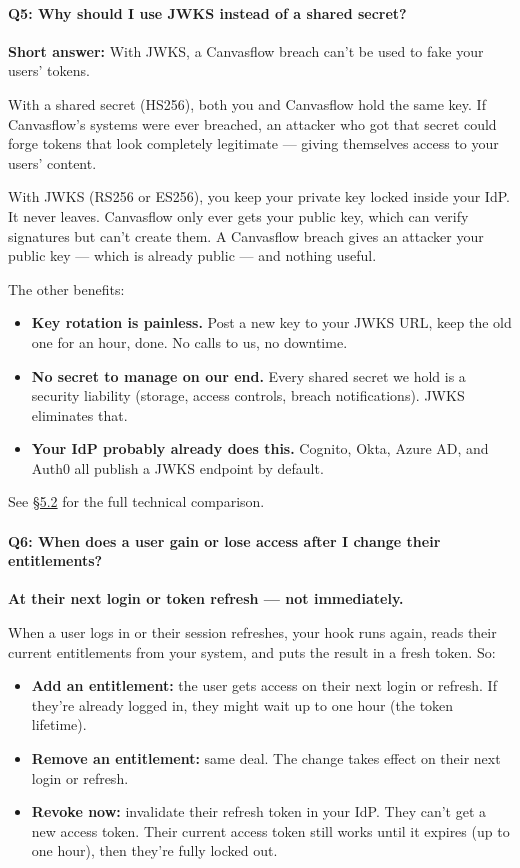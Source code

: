 \paragraph{Q5: Why should I use JWKS instead of a shared secret?}

\textbf{Short answer:} With JWKS, a Canvasflow breach can't be used to fake your users'
tokens.

With a shared secret (HS256), both you and Canvasflow hold the same key. If Canvasflow's
systems were ever breached, an attacker who got that secret could forge tokens that look
completely legitimate --- giving themselves access to your users' content.

With JWKS (RS256 or ES256), you keep your private key locked inside your IdP. It never
leaves. Canvasflow only ever gets your public key, which can verify signatures but can't
create them. A Canvasflow breach gives an attacker your public key --- which is already
public --- and nothing useful.

The other benefits:
\begin{itemize}
  \item \textbf{Key rotation is painless.} Post a new key to your JWKS URL, keep the old
    one for an hour, done. No calls to us, no downtime.
  \item \textbf{No secret to manage on our end.} Every shared secret we hold is a
    security liability (storage, access controls, breach notifications). JWKS eliminates
    that.
  \item \textbf{Your IdP probably already does this.} Cognito, Okta, Azure AD, and Auth0
    all publish a JWKS endpoint by default.
\end{itemize}

See \hyperref[sec:signing-path-requirements]{\S5.2} for the full technical comparison.

\paragraph{Q6: When does a user gain or lose access after I change their entitlements?}

\textbf{At their next login or token refresh --- not immediately.}

When a user logs in or their session refreshes, your hook runs again, reads their current
entitlements from your system, and puts the result in a fresh token. So:
\begin{itemize}
  \item \textbf{Add an entitlement:} the user gets access on their next login or refresh.
    If they're already logged in, they might wait up to one hour (the token lifetime).
  \item \textbf{Remove an entitlement:} same deal. The change takes effect on their next
    login or refresh.
  \item \textbf{Revoke now:} invalidate their refresh token in your IdP. They can't get
    a new access token. Their current access token still works until it expires (up to
    one hour), then they're fully locked out.
\end{itemize}


